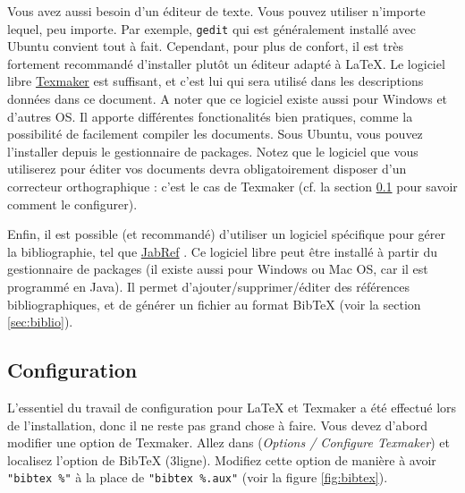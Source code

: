 \documentclass{ceri}
\begin{document}
Vous avez aussi besoin d'un éditeur de texte. Vous pouvez utiliser n'importe lequel, peu importe. Par exemple, \texttt{gedit} qui est généralement installé avec Ubuntu convient tout à fait. Cependant, pour plus de confort, il est très fortement recommandé d'installer plutôt un éditeur adapté à \LaTeX{}. Le logiciel libre \href{http://www.xm1math.net/texmaker/}{Texmaker} \cite{Texmaker2011} est suffisant, et c'est lui qui sera utilisé dans les descriptions données dans ce document. A noter que ce logiciel existe aussi pour Windows et d'autres OS. Il apporte différentes fonctionalités bien pratiques, comme la possibilité de facilement compiler les documents. Sous Ubuntu, vous pouvez l'installer depuis le gestionnaire de packages. Notez que le logiciel que vous utiliserez pour éditer vos documents devra obligatoirement disposer d'un correcteur orthographique : c'est le cas de Texmaker (cf\@. la section \ref{sec:configuration} pour savoir comment le configurer).

Enfin, il est possible (et recommandé) d'utiliser un logiciel spécifique pour gérer la bibliographie, tel que \href{http://jabref.sourceforge.net/}{JabRef} \cite{JabRef2008}. Ce logiciel libre peut être installé à partir du gestionnaire de packages (il existe aussi pour Windows ou Mac OS, car il est programmé en Java). Il permet d'ajouter/supprimer/éditer des références bibliographiques, et de générer un fichier au format BibTeX (voir la section \ref{sec:biblio}).
	
\subsection{Configuration}
\label{sec:configuration}
L'essentiel du travail de configuration pour \LaTeX{} et Texmaker a été effectué lors de l'installation, donc il ne reste pas grand chose à faire. Vous devez d'abord modifier une option de Texmaker. Allez dans (\textit{Options / Configure Texmaker}) et localisez l'option de BibTeX (3\ieme ligne). Modifiez cette option de manière à avoir \texttt{"bibtex \%"} à la place de \texttt{"bibtex \%.aux"} (voir la figure \ref{fig:bibtex}).
\end{document}
